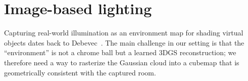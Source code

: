 \section{Image-based lighting}

Capturing real-world illumination as an environment map for shading virtual
objects dates back to Debevec~\parencite{debevec1998rendering}. The main
challenge in our setting is that the “environment” is not a chrome ball but
a learned 3DGS reconstruction; we therefore need a way to rasterize the
Gaussian cloud into a cubemap that is geometrically consistent with the
captured room.

